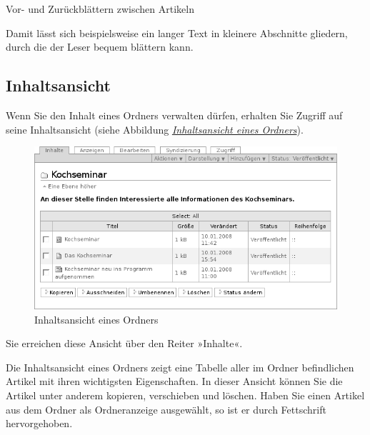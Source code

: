 \documentclass[a4paper,12pt,ngerman]{manual}
\begin{document}
Vor- und Zurückblättern zwischen Artikeln

Damit lässt sich beispielsweise ein langer Text in kleinere
Abschnitte gliedern, durch die der Leser bequem blättern kann.


\subsection{Inhaltsansicht}

Wenn Sie den Inhalt eines Ordners verwalten dürfen, erhalten Sie Zugriff auf
seine Inhaltsansicht (siehe Abbildung \hyperlink{fig-ordnerinhalt}{\emph{Inhaltsansicht eines Ordners}}).
\hypertarget{fig-ordnerinhalt}{}\begin{figure}[htbp]
\centering

\includegraphics{ordnerinhalt.png}
\caption{Inhaltsansicht eines Ordners}\end{figure}

Sie erreichen diese Ansicht über den Reiter »Inhalte«.

Die Inhaltsansicht eines Ordners zeigt eine Tabelle aller im Ordner
befindlichen Artikel mit ihren wichtigsten Eigenschaften. In dieser Ansicht
können Sie die Artikel unter anderem kopieren, verschieben und löschen.
Haben Sie einen Artikel aus dem Ordner als Ordneranzeige ausgewählt, so ist er
durch Fettschrift hervorgehoben.
\end{document}
